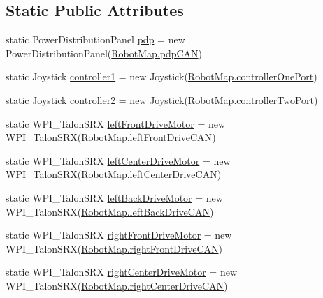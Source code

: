 \subsection*{Static Public Attributes}
\begin{DoxyCompactItemize}
\item 
static Power\+Distribution\+Panel \hyperlink{classfrc_1_1robot_1_1OI_a98d90326dfdaf14238d2f81c20c55f3f}{pdp} = new Power\+Distribution\+Panel(\hyperlink{classfrc_1_1robot_1_1RobotMap_af7db1426412719318df15f9838b70198}{Robot\+Map.\+pdp\+C\+AN})
\item 
static Joystick \hyperlink{classfrc_1_1robot_1_1OI_a06db411c1eebb80d10f685c57954bac9}{controller1} = new Joystick(\hyperlink{classfrc_1_1robot_1_1RobotMap_adf0118e5a9de03d6f71ea1e5a6a81cc9}{Robot\+Map.\+controller\+One\+Port})
\item 
static Joystick \hyperlink{classfrc_1_1robot_1_1OI_a749a3f830f90057dc4fd65e7f34a3251}{controller2} = new Joystick(\hyperlink{classfrc_1_1robot_1_1RobotMap_a762ebcaa07378c37d88654506850e07f}{Robot\+Map.\+controller\+Two\+Port})
\item 
static W\+P\+I\+\_\+\+Talon\+S\+RX \hyperlink{classfrc_1_1robot_1_1OI_a3f39e281419ebd60b94126e87e3ec81d}{left\+Front\+Drive\+Motor} = new W\+P\+I\+\_\+\+Talon\+S\+RX(\hyperlink{classfrc_1_1robot_1_1RobotMap_a2e3dbfb148d6fa2b7f430614887217f0}{Robot\+Map.\+left\+Front\+Drive\+C\+AN})
\item 
static W\+P\+I\+\_\+\+Talon\+S\+RX \hyperlink{classfrc_1_1robot_1_1OI_a8c33a9f0b9e366e48abd23ab01907e18}{left\+Center\+Drive\+Motor} = new W\+P\+I\+\_\+\+Talon\+S\+RX(\hyperlink{classfrc_1_1robot_1_1RobotMap_a9d04abf669a5ad42cb023e3ff3b56bcd}{Robot\+Map.\+left\+Center\+Drive\+C\+AN})
\item 
static W\+P\+I\+\_\+\+Talon\+S\+RX \hyperlink{classfrc_1_1robot_1_1OI_a88080d092baf8ece2c22f2ceec4f6f8f}{left\+Back\+Drive\+Motor} = new W\+P\+I\+\_\+\+Talon\+S\+RX(\hyperlink{classfrc_1_1robot_1_1RobotMap_a0f78f6850b0e060cc6acd88cc80ffa04}{Robot\+Map.\+left\+Back\+Drive\+C\+AN})
\item 
static W\+P\+I\+\_\+\+Talon\+S\+RX \hyperlink{classfrc_1_1robot_1_1OI_ae055ab4ea5a306737c950b1bfddf7352}{right\+Front\+Drive\+Motor} = new W\+P\+I\+\_\+\+Talon\+S\+RX(\hyperlink{classfrc_1_1robot_1_1RobotMap_a4ca461a7ad91df180971974fd6abc236}{Robot\+Map.\+right\+Front\+Drive\+C\+AN})
\item 
static W\+P\+I\+\_\+\+Talon\+S\+RX \hyperlink{classfrc_1_1robot_1_1OI_a9be3279c18d1f3433d6b07c706eb1457}{right\+Center\+Drive\+Motor} = new W\+P\+I\+\_\+\+Talon\+S\+RX(\hyperlink{classfrc_1_1robot_1_1RobotMap_a3ca36356410531e52126d2979ee17f13}{Robot\+Map.\+right\+Center\+Drive\+C\+AN})

\end{DoxyCompactItemize}
